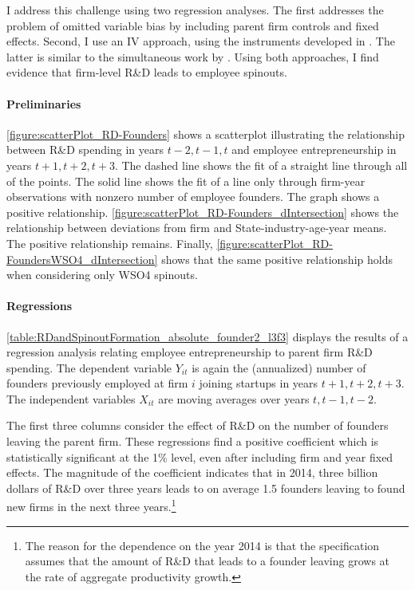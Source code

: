 \documentclass[11pt,english]{article}
\theoremstyle{remark}
\begin{document}
I address this challenge using two regression analyses. The first addresses the problem of omitted variable bias by including parent firm controls and fixed effects. Second, I use an IV approach, using the instruments developed in \cite{bloom_identifying_2013}. The latter is similar to the simultaneous work by \cite{babina_entrepreneurial_2018}. Using both approaches, I find evidence that firm-level R\&D leads to employee spinouts. 

\paragraph{Preliminaries}

\autoref{figure:scatterPlot_RD-Founders} shows a scatterplot illustrating the relationship between R\&D spending in years $t-2,t-1,t$ and employee entrepreneurship in years $t+1,t+2,t+3$. The dashed line shows the fit of a straight line through all of the points. The solid line shows the fit of a line only through firm-year observations with nonzero number of employee founders. The graph shows a positive relationship. \autoref{figure:scatterPlot_RD-Founders_dIntersection} shows the relationship between deviations from firm and State-industry-age-year means. The positive relationship remains. Finally, \autoref{figure:scatterPlot_RD-FoundersWSO4_dIntersection} shows that the same positive relationship holds when considering only WSO4 spinouts. 


\paragraph{Regressions}

\autoref{table:RDandSpinoutFormation_absolute_founder2_l3f3} displays the results of a regression analysis relating employee entrepreneurship to parent firm R\&D spending. The dependent variable $Y_{it}$ is again the (annualized) number of founders previously employed at firm $i$ joining startups in years $t+1,t+2,t+3$. The independent variables $X_{it}$ are moving averages over years $t,t-1,t-2$. 

The first three columns consider the effect of R\&D on the number of founders leaving the parent firm. These regressions find a positive coefficient which is statistically significant at the 1\% level, even after including firm and year fixed effects. The magnitude of the coefficient indicates that in 2014, three billion dollars of R\&D over three years leads to on average 1.5 founders leaving to found new firms in the next three years.\footnote{The reason for the dependence on the year 2014 is that the specification assumes that the amount of R\&D that leads to a founder leaving grows at the rate of aggregate productivity growth.}
\end{document}
